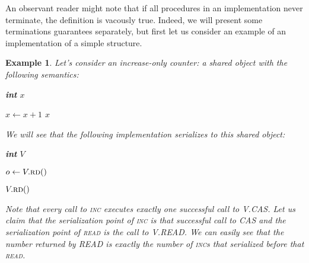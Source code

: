 \documentclass[a4paper,11pt]{article}
\newtheorem{example}{Example}
\newtheorem{definition}{Definition}
\newcommand{\fn}[1]{\textsc{#1}}
\begin{document}
An observant reader might note that if all procedures in an implementation never terminate, the definition is
vacously true. Indeed, we will present some terminations guarantees separately, but first let us consider an
example of an implementation of a simple structure.








\begin{example}
Let's consider an increase-only counter: a shared object with the following semantics:

\begin{algorithmic}[1]
\State \textbf{int} $x$

	$x \gets x + 1$
\EndFunction
{}
	\State\Return$x$
\EndFunction
\end{algorithmic}

We will see that the following implementation serializes to this shared object:

\begin{algorithmic}[1]
\State \textbf{int} $V$ 

	\Repeat
		$o \gets V.\fn{rd}()$
		\Until{$V.\fn{CAS}(o, o+1)$}
\EndFunction

	\State\Return $V.\fn{rd}()$
\EndFunction
\end{algorithmic}

Note that every call to \fn{inc} executes exactly one successful call to V.CAS. Let us claim that the serialization
point of \fn{inc} is that successful call to CAS and the serialization point of \fn{read} is the call to
V.READ. We can easily see that the number returned by READ is exactly the number of \fn{inc}s that serialized
before that \fn{read}.
\end{example}
\end{document}
